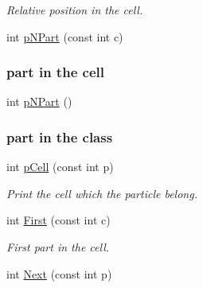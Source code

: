 \begin{DoxyCompactItemize}
\begin{DoxyCompactList}\small\item\em Relative position in the cell. \end{DoxyCompactList}\item 
int \hyperlink{classDdDoubleLoop_a6a2d62432ffa4c509f4a7f1fb5aa7630}{p\+N\+Part} (const int c)\hypertarget{classDdDoubleLoop_a6a2d62432ffa4c509f4a7f1fb5aa7630}{}\label{classDdDoubleLoop_a6a2d62432ffa4c509f4a7f1fb5aa7630}

\begin{DoxyCompactList}\small\item\em \subsubsection*{part in the cell}\end{DoxyCompactList}\item 
int \hyperlink{classDdDoubleLoop_a388622b5e7d2ad20e8ac1a8a951d655f}{p\+N\+Part} ()\hypertarget{classDdDoubleLoop_a388622b5e7d2ad20e8ac1a8a951d655f}{}\label{classDdDoubleLoop_a388622b5e7d2ad20e8ac1a8a951d655f}

\begin{DoxyCompactList}\small\item\em \subsubsection*{part in the class}\end{DoxyCompactList}\item 
int \hyperlink{classDdDoubleLoop_a2d9507d25b2164c0bf4282b38b4a5d88}{p\+Cell} (const int p)\hypertarget{classDdDoubleLoop_a2d9507d25b2164c0bf4282b38b4a5d88}{}\label{classDdDoubleLoop_a2d9507d25b2164c0bf4282b38b4a5d88}

\begin{DoxyCompactList}\small\item\em Print the cell which the particle belong. \end{DoxyCompactList}\item 
int \hyperlink{classDdDoubleLoop_aafe289a3b1eb08ed1b960f1f93e8d836}{First} (const int c)\hypertarget{classDdDoubleLoop_aafe289a3b1eb08ed1b960f1f93e8d836}{}\label{classDdDoubleLoop_aafe289a3b1eb08ed1b960f1f93e8d836}

\begin{DoxyCompactList}\small\item\em First part in the cell. \end{DoxyCompactList}\item 
int \hyperlink{classDdDoubleLoop_a8b3b22221e5f8d516a2c4818bea703ad}{Next} (const int p)\hypertarget{classDdDoubleLoop_a8b3b22221e5f8d516a2c4818bea703ad}{}\label{classDdDoubleLoop_a8b3b22221e5f8d516a2c4818bea703ad}


\end{DoxyCompactItemize}
